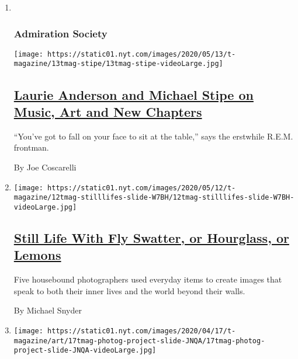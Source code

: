 \begin{enumerate}
\def\labelenumi{\arabic{enumi}.}
\item ~
  \hypertarget{admiration-society}{%
  \subsubsection{Admiration Society}\label{admiration-society}}

  \texttt{[image: https://static01.nyt.com/images/2020/05/13/t-magazine/13tmag-stipe/13tmag-stipe-videoLarge.jpg]}

  \hypertarget{laurie-anderson-and-michael-stipe-on-music-art-and-new-chapters}{%
  \subsection{\texorpdfstring{\href{/2020/05/14/t-magazine/michael-stipe-laurie-anderson.html}{Laurie
  Anderson and Michael Stipe on Music, Art and New
  Chapters}}{Laurie Anderson and Michael Stipe on Music, Art and New Chapters}}\label{laurie-anderson-and-michael-stipe-on-music-art-and-new-chapters}}

  ``You've got to fall on your face to sit at the table,'' says the
  erstwhile R.E.M. frontman.

  By Joe Coscarelli
\item
  \texttt{[image: https://static01.nyt.com/images/2020/05/12/t-magazine/12tmag-stilllifes-slide-W7BH/12tmag-stilllifes-slide-W7BH-videoLarge.jpg]}

  \hypertarget{still-life-with-fly-swatter-or-hourglass-or-lemons}{%
  \subsection{\texorpdfstring{\href{/2020/05/12/t-magazine/photographers-coronavirus-still-life-pictures.html}{Still
  Life With Fly Swatter, or Hourglass, or
  Lemons}}{Still Life With Fly Swatter, or Hourglass, or Lemons}}\label{still-life-with-fly-swatter-or-hourglass-or-lemons}}

  Five housebound photographers used everyday items to create images
  that speak to both their inner lives and the world beyond their walls.

  By Michael Snyder
\item
  \texttt{[image: https://static01.nyt.com/images/2020/04/17/t-magazine/art/17tmag-photog-project-slide-JNQA/17tmag-photog-project-slide-JNQA-videoLarge.jpg]}

  \hypertarget{eight-photographers-pictures-from-isolation}{%
}
\end{enumerate}
